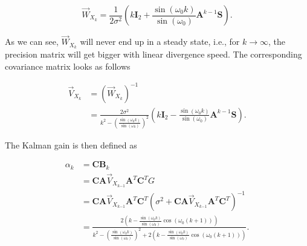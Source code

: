 \documentclass[11pt,a4paper,twoside]{report}
\newcommand{\messF}[3]{\overrightarrow{#1}_{{#2}_{k{#3}}}}
\newcommand{\mat}[1]{\mathbf{#1}}
\begin{document}
\begin{equation*}
	\messF{W}{X}{} = \frac{1}{2\sigma^2}\left(k\mat{I}_2 + \frac{\sin{\left(\omega_0k\right)}}{\sin{\left(\omega_0\right)}}\mat{A}^{k-1}\mat{S}\right) .
\end{equation*}

As we can see, $\messF{W}{X}{}$ will never end up in a steady state, i.e., for $k \rightarrow \infty$, the precision matrix will get bigger with linear divergence speed. The corresponding covariance matrix looks as follows

\begin{align}
	\messF{V}{X}{} &= \left(\messF{W}{X}{}\right)^{-1} \\
	&= \frac{2\sigma^2}{k^2-\left(\frac{\sin{\left(\omega_0k\right)}}{\sin{\left(\omega_0\right)}}\right)^2}\left( k \mat{I}_2 - \frac{\sin{\left(\omega_0k\right)}}{\sin{\left(\omega_0\right)}}\mat{A}^{k-1}\mat{S}\right).
\end{align}

The Kalman gain is then defined as

\begin{align}
	\alpha_k &= \mat{CB}_k \\
	&= \mat{C}\mat{A}\messF{V}{X}{-1}\mat{A}^T\mat{C}^TG \\
	&= \mat{C}\mat{A}\messF{V}{X}{-1}\mat{A}^T\mat{C}^T\left( \sigma^2 + \mat{C} \mat{A}\messF{V}{X}{-1} \mat{A}^T\mat{C}^T \right)^{-1} \\
	&= \frac{2\left(k-\frac{\sin{\left(\omega_0k\right)}}{\sin{\left(\omega_0\right)}}\cos{\left(\omega_0\left(k+1\right)\right)}\right)}{k^2-\left(\frac{\sin{\left(\omega_0k\right)}}{\sin{\left(\omega_0\right)}}\right)^2 + 2\left(k-\frac{\sin{\left(\omega_0k\right)}}{\sin{\left(\omega_0\right)}}\cos{\left(\omega_0\left(k+1\right)\right)}\right)}.
\end{align}

\clearpage

%

\end{document}
